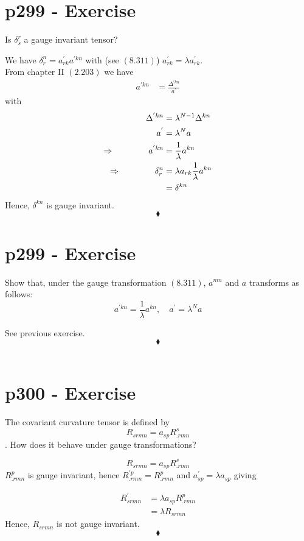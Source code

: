 \section{p299 - Exercise}
\begin{tcolorbox}
Is $\delta^r_s$ a gauge invariant tensor?
\end{tcolorbox}
We have $\delta^n_r = a^{'}_{rk} a^{'kn} $ with (see $\mathbf{(8.311)}$) $a^{'}_{rk}= \lambda a^{'}_{rk} $.\\
From chapter II $\mathbf{(2.203)}$ we have 
\begin{align*}
a^{'kn} &= \frac{\Delta^{'kn}}{a^{'}}
\end{align*}
with
\begin{align*}
\Delta^{'kn} &= \lambda^{N-1}\Delta^{kn}\\
a^{'}&= \lambda^N a\\
\Rightarrow\quad\quad\quad\quad a^{'kn} &= \frac{ 1}{\lambda} a^{kn}\\
\Rightarrow\quad\quad\quad\quad \delta^n_r &= \lambda a_{rk}\frac{ 1}{\lambda} a^{kn}\\
&= \delta^{kn} 
\end{align*}
Hence, $ \delta^{kn} $ is gauge invariant.
$$\blacklozenge$$
\newpage
\section{p299 - Exercise}
\begin{tcolorbox}
Show that, under the gauge transformation $\mathbf{(8.311)}$, $a^{mn}$ and $a$ transforms as follows:
$$a^{'kn} = \frac{ 1}{\lambda} a^{kn},\quad a^{'}= \lambda^N a $$
\end{tcolorbox}
See previous exercise.
$$\blacklozenge$$\\

\section{p300 - Exercise}
\begin{tcolorbox}
The covariant curvature tensor is defined by $$R_{srmn} = a_{sp}R^s_{.rmn}$$.
How does it behave under gauge transformations?
\end{tcolorbox}
 $$R_{srmn} = a_{sp}R^s_{.rmn}$$
 $R^p_{.rmn} $ is gauge invariant, hence $R^{'p}_{.rmn} =R^p_{.rmn} $ and $a^{'}_{sp}= \lambda a^{}_{sp} $ giving
 
 \begin{align*}
 R^{'}_{srmn} &=\lambda a^{}_{sp}R^p_{.rmn}\\
 &=\lambda R_{srmn}
 \end{align*}
 Hence, $R_{srmn}$ is not gauge invariant.
$$\blacklozenge$$\\
\newpage


